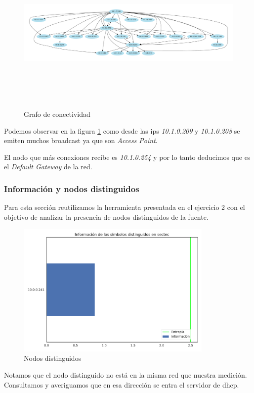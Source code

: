 \begin{figure}[H]
   \centering
       \includegraphics[page=1,height=8cm ,width=1.08\textwidth]{../img/red-sectec}
 \caption{Grafo de conectividad}
 \label{fig:grafo-sectec}
\end{figure}

Podemos observar en la figura \ref{fig:grafo-sectec} como desde las ips \emph{10.1.0.209} y \emph{10.1.0.208} se emiten muchos broadcast ya que son \emph{Access Point}.

El nodo que más conexiones recibe es \emph{10.1.0.254}  y por lo tanto deducimos que es el \emph{Default Gateway} de la red.	


\subsubsection{Información y nodos distinguidos}


Para esta sección reutilizamos la herramienta presentada en el ejercicio 2 con el objetivo de analizar la presencia de nodos distinguidos de la fuente. \\

\begin{figure}[H]
    \centering
    \includegraphics[page=1, height=6.55cm ,width=\textwidth]{../img/distinguidos-sectec}
    \caption{Nodos distinguidos}
    \label{fig:distinguidos-sectec}
\end{figure}

Notamos que el nodo distinguido no está en la misma red que nuestra medición. Consultamos y averiguamos que en esa dirección se entra el servidor de dhcp.
